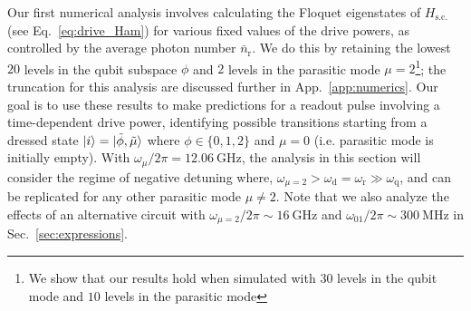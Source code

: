 \documentclass[%
reprint,
superscriptaddress,
 amsmath,amssymb,
 aps,
 prx,
longbibliography,
floatfix,
]{revtex4-2}
\begin{document}
Our first numerical analysis involves calculating the Floquet eigenstates of $H_\textrm{s.c.}$ (see Eq.~\ref{eq:drive_Ham}) for various fixed values of the drive powers, as controlled by the average photon number $\bar n_\textrm{r}$.  We do this by retaining the lowest $20$ levels in the qubit subspace $\phi$ and $2$ levels in the parasitic mode $\mu=2$\footnote{We show that our results hold when simulated with $30$ levels in the qubit mode and $10$ levels in the parasitic mode}; the truncation for this analysis are discussed further in App.~\ref{app:numerics}.
Our goal is to use these results to make predictions for a readout pulse involving a time-dependent drive power, identifying possible transitions starting from a dressed state $\ket{i} =\ket{\tilde{\phi}, \tilde{\mu}}$ where $\phi\in\{0,1,2\}$ and $\mu=0$ (i.e. parasitic mode is initially empty). With $\omega_\mu/2\pi=12.06 \ \mathrm{GHz}$, the analysis in this section will consider the regime of negative detuning where, $\omega_{\mu=2}>\omega_\textrm{d}=\omega_\textrm{r} \gg \omega_\textrm{q}$, and can be replicated for any other parasitic mode $\mu \neq 2$. Note that we also analyze the effects of an alternative circuit with $\omega_{\mu=2}/2\pi\sim 16 \ \mathrm{GHz}$ and $\omega_{01}/2\pi\sim 300 \ \mathrm{MHz}$ in Sec.~\ref{sec:expressions}.
\end{document}
